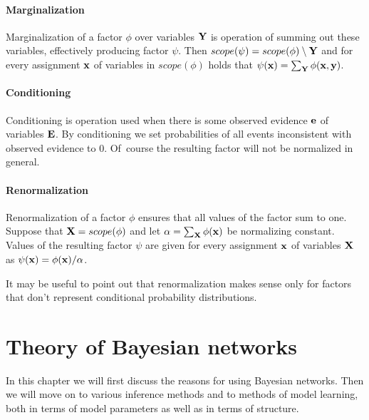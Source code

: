 \documentclass[english,cover]{fitthesis} %
\newcommand{\vars}[1]{{\bold{#1}}}         %
\begin{document}
\subsubsection{Marginalization}
Marginalization of a factor $\phi$ over variables $\vars{Y}$ is operation of summing out these variables, effectively producing factor $\psi$. Then $scope(\psi) = scope(\phi) \setminus \vars{Y}$ and for every assignment $\vars{x}$ of variables in $scope(\phi)$ holds that $\psi(\vars{x}) = \sum_\vars{Y} \phi(\vars{x},\vars{y})$.

\subsubsection{Conditioning}
Conditioning is operation used when there is some observed evidence $\vars{e}$ of variables $\vars{E}$. By conditioning we set probabilities of all events inconsistent with observed evidence to 0. Of~course the resulting factor will not be normalized in general.

\subsubsection{Renormalization}
Renormalization of a factor $\phi$ ensures that all values of the factor sum to one. Suppose that $\vars{X} = scope(\phi)$ and let $\alpha = \sum_\vars{X} \phi(\vars{x})$ be normalizing constant. Values of the resulting factor $\psi$ are given for every assignment $\vars{x}$ of variables $\vars{X}$ as $\psi(\vars{x}) = \phi(\vars{x}) / \alpha$.

It may be useful to point out that renormalization makes sense only for factors that don't represent conditional probability distributions.



































\chapter{Theory of Bayesian networks}
In this chapter we will first discuss the reasons for using Bayesian networks. Then we will move on to various inference methods and to methods of model learning, both in terms of model parameters as well as in terms of structure.
\end{document}
